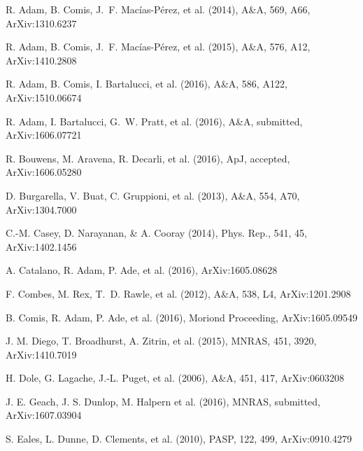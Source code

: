 \documentclass[11pt,a4paper,twoside,graphicx,color]{article}
\begin{document}
\begin{thebibliography}{9}
{\scriptsize

R. Adam, B. Comis, J.~F. Mac\'ias-P\'erez, et al. (2014), A\&A, 569, A66, ArXiv:1310.6237

R. Adam, B. Comis, J.~F. Mac\'ias-P\'erez, et al. (2015), A\&A, 576, A12, ArXiv:1410.2808

R. Adam, B. Comis, I. Bartalucci, et al. (2016), A\&A, 586, A122, ArXiv:1510.06674

R. Adam, I. Bartalucci, G.~W. Pratt, et al. (2016), A\&A, submitted, ArXiv:1606.07721

R. Bouwens, M. Aravena, R. Decarli, et al. (2016), ApJ, accepted, ArXiv:1606.05280

D. Burgarella, V. Buat, C. Gruppioni, et al. (2013), A\&A, 554, A70, ArXiv:1304.7000
	
C.-M. Casey, D. Narayanan, \& A. Cooray (2014), Phys. Rep., 541, 45, ArXiv:1402.1456

A. Catalano, R. Adam, P. Ade, et al. (2016), ArXiv:1605.08628

F. Combes, M. Rex, T.~D. Rawle, et al. (2012), A\&A, 538, L4, ArXiv:1201.2908

B. Comis, R. Adam, P. Ade, et al. (2016), Moriond Proceeding, ArXiv:1605.09549

J. M. Diego, T. Broadhurst, A. Zitrin, et al. (2015), MNRAS, 451, 3920, ArXiv:1410.7019

H. Dole, G. Lagache, J.-L. Puget, et al. (2006), A\&A, 451, 417, ArXiv:0603208

J. E. Geach, J. S. Dunlop, M. Halpern et al. (2016), MNRAS, submitted, ArXiv:1607.03904

S. Eales, L. Dunne, D. Clements, et al. (2010), PASP, 122, 499, ArXiv:0910.4279

}
\end{thebibliography}
\end{document}
